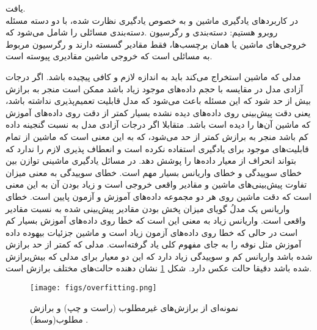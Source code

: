 \cite{sutton1998introduction}
یافت.\\
در کاربردهای یادگیری ماشین و به خصوص یادگیری نظارت شده، با دو دسته مسئله روبرو هستیم: دسته‌بندی
و رگرسیون
.دسته‌بندی مسائلی را شامل می‌شود که خروجی‌های ماشین یا همان برچسب‌ها، فقط مقادیر گسسته دارند و رگرسیون مربوط به مسائلی است که خروجی ماشین مقادیری پیوسته است.
\par
مدلی که ماشین استخراج می‌کند باید به اندازه لازم و کافی پیچیده باشد. اگر درجات آزادی مدل در مقایسه با حجم داده‌های موجود زیاد باشد ممکن است منجر به برازش بیش از حد 
شود که این مسئله باعث می‌شود که مدل قابلیت تعمیم‌پذیری نداشته باشد، یعنی دقت پیش‌بینی روی داده‌های دیده‌ نشده بسیار کمتر از دقت روی داده‌های آموزش که ماشین آن‌ها را دیده است باشد. 
متقابلا اگر درجات آزادی مدل به نسبت گنجینه داده کم باشد منجر به برازش کمتر از حد 
می‌شود، که به این معنی است که ماشین از تمام قابلیت‌های موجود برای یادگیری استفاده نکرده است و انعطاف پذیری لازم را ندارد که بتواند انحراف از معیار داده‌ها را پوشش دهد.
در مسائل یادگیری ماشینی توازن بین خطای سوییدگی 
و خطای واریانس بسیار مهم است. خطای سوییدگی به معنی میزان تفاوت پیش‌بینی‌های ماشین و مقادیر واقعی خروجی است و زیاد بودن آن به این معنی است که دقت ماشین روی هر دو مجموعه داده‌های آموزش و آزمون پایین است. خطای واریانس یک مدلُ گویای میزان پخش بودن مقادیر پیش‌بینی شده به نسبت مقادیر واقعی است. واریانس زیاد به معنی این است که خطا روی داده‌های آموزش بسیار کم است در حالی که خطا روی داده‌های آزمون زیاد است و ماشین جزئیات بیهوده داده آموزش مثل نوفه را به جای مفهوم کلی یاد گرفته‌است.   
مدلی که کمتر از حد برازش شده باشد واریانس کم و سوییدگی زیاد دارد که این دو معیار برای مدلی که بیش‌برازش شده باشد دقیقا حالت عکس دارد.
شکل
 \ref{fig:overfit}
نشان دهنده حالت‌های مختلف برازش است.
 \begin{figure}
	\begin{center}
		\texttt{[image: figs/overfitting.png]}
	\end{center}
	\caption[نمونه‌ای از برازش‌های غیرمطلوب (راست و چپ) و برازش مطلوب(وسط)]{
		نمونه‌ای از برازش‌های غیرمطلوب (راست و چپ) و برازش مطلوب(وسط)
		\footnotemark.}
	
	\label{fig:overfit}
\end{figure} 

